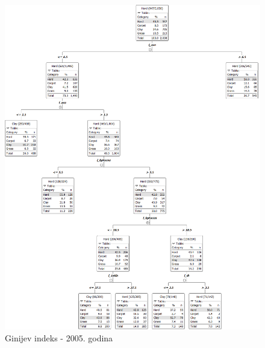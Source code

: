 \documentclass[a4paper]{article}
\begin{document}
\begin{figure}[H]
	\begin{center}
		\includegraphics[width=\textwidth]{Klasifikacija/DrvoOdlucivanja/2005/DrvoOdlucivanja.png}
	\end{center}
	\caption{Ginijev indeks - 2005. godina}
	\label{fig:DrvoOdlucivanja2005}
\end{figure}
\end{document}
